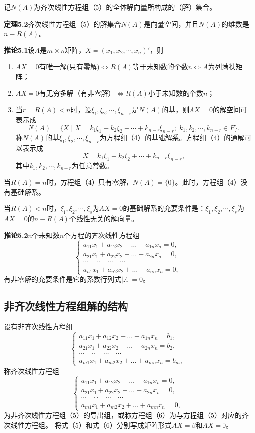 \documentclass{article}
\begin{document}
记$N(A)$为齐次线性方程组（5）的全体解向量所构成的（解）集合。

\textbf{定理5.2}\quad 齐次线性方程组（5）的解集合$N(A)$是向量空间，并且$N(A)$的维数是$n-R(A)$。

\textbf{推论5.1}\quad 设$A$是$m\times n$矩阵，$X=(x_1,x_2,\cdots,x_n)'$，则
\begin{enumerate}
    \item $AX=0$有唯一解(只有零解)$\iff R(A)$等于未知数的个数$n \iff A$为列满秩矩阵；
    \item $AX=0$有无穷多解（有非零解）$\iff R(A)$小于未知数的个数$n$；
    \item 当$r=R(A)<n$时，设$\xi_1,\xi_2,\cdots,\xi_{n-r}$是$N(A)$的基，则$AX=0$的解空间可表示成
    \[
    N(A)=\{X\mid X=k_1\xi_1+k_2\xi_2+\cdots+k_{n-r}\xi_{n-r};\;k_1,k_2,\cdots,k_{n-r}\in F\}.
    \]
    称$N(A)$的基$\xi_1,\xi_2,\cdots,\xi_{n-r}$为方程组（4）的基础解系。方程组（4）的通解可以表示成
    \[
    X=k_1\xi_1+k_2\xi_2+\cdots+k_{n-r}\xi_{n-r},
    \]
    其中$k_1,k_2,\cdots,k_{n-r}$为任意常数。
\end{enumerate}

当$R(A)=n$时，方程组（4）只有零解，$N(A)=\{0\}$。此时，方程组（4）没有基础解系。

当$R(A)<n$时，$\xi_1,\xi_2,\cdots,\xi_s$为$AX=0$的基础解系的充要条件是：$\xi_1,\xi_2,\cdots,\xi_s$为$AX=0$的$n-R(A)$个线性无关的解向量。

\textbf{推论5.2}\quad $n$个未知数$n$个方程的齐次线性方程组
\[
\begin{cases}
a_{11}x_1+a_{12}x_2+\dots+a_{1n}x_n=0,\\
a_{21}x_1+a_{22}x_2+\dots+a_{2n}x_n=0,\\
\cdots\quad\cdots\quad\cdots\quad\cdots\\
a_{n1}x_1+a_{n2}x_2+\dots+a_{nn}x_n=0,
\end{cases} \tag{4}
\]
有非零解的充要条件是它的系数行列式$|A|=0$。

\subsection{非齐次线性方程组解的结构}
设有非齐次线性方程组
\[
\begin{cases}
a_{11}x_1+a_{12}x_2+\dots+a_{1n}x_n=b_1,\\
a_{21}x_1+a_{22}x_2+\dots+a_{2n}x_n=b_2,\\
\cdots\quad\cdots\quad\cdots\quad\cdots\\
a_{m1}x_1+a_{m2}x_2+\dots+a_{mn}x_n=b_m,
\end{cases} \tag{5}
\]
称齐次线性方程组
\[
\begin{cases}
a_{11}x_1+a_{12}x_2+\dots+a_{1n}x_n=0,\\
a_{21}x_1+a_{22}x_2+\dots+a_{2n}x_n=0,\\
\cdots\quad\cdots\quad\cdots\quad\cdots\\
a_{m1}x_1+a_{m2}x_2+\dots+a_{mn}x_n=0,
\end{cases} \tag{6}
\]
为非齐次线性方程组（5）的导出组，或称方程组（6）为与方程组（5）对应的齐次线性方程组。
将式（5）和式（6）分别写成矩阵形式$AX=\beta$和$AX=0$。
\end{document}
